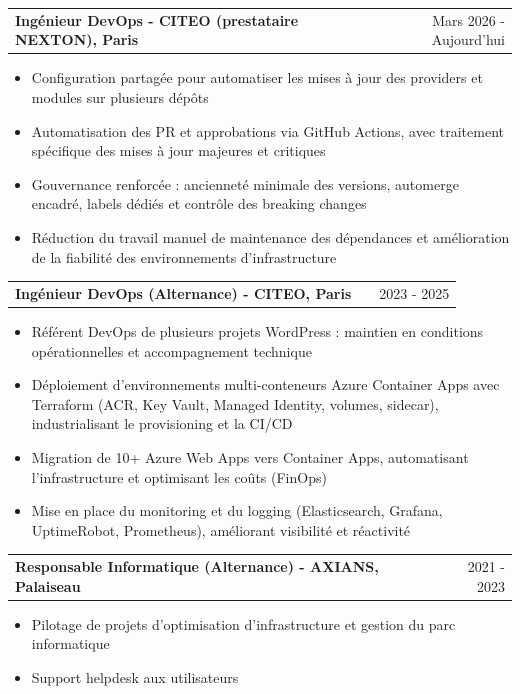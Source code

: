 \documentclass[a4paper,10pt]{article}
\makeatletter
\newenvironment{joblong}[2]
    {
    \begin{tabularx}{\linewidth}{@{}l X r@{}}
    \textbf{#1} & \hfill &  #2 \\[2pt]
    \end{tabularx}
    \begin{minipage}[t]{\linewidth}
    \begin{itemize}[after=\strut, leftmargin=1em, itemsep=3pt,label=--]
    }
    {
    \end{itemize}
    \end{minipage}    
    }
\makeatother
\begin{document}
\begin{joblong}{Ingénieur DevOps - CITEO (prestataire NEXTON), Paris}{Mars 2026 - Aujourd'hui}
\begin{itemize}[nosep, leftmargin=1em, itemsep=0pt, label=\textbullet]
\item Configuration partagée pour automatiser les mises à jour des providers et modules sur plusieurs dépôts
\item Automatisation des PR et approbations via GitHub Actions, avec traitement spécifique des mises à jour majeures et critiques
\item Gouvernance renforcée : ancienneté minimale des versions, automerge encadré, labels dédiés et contrôle des breaking changes
\item Réduction du travail manuel de maintenance des dépendances et amélioration de la fiabilité des environnements d’infrastructure
\end{itemize}
\end{joblong}


\vspace{2pt}

\begin{joblong}{Ingénieur DevOps (Alternance) - CITEO, Paris}{2023 - 2025}
\item Référent DevOps de plusieurs projets WordPress : maintien en conditions opérationnelles et accompagnement technique
\item Déploiement d'environnements multi-conteneurs Azure Container Apps avec Terraform (ACR, Key Vault, Managed Identity, volumes, sidecar), industrialisant le provisioning et la CI/CD
\item Migration de 10+ Azure Web Apps vers Container Apps, automatisant l'infrastructure et optimisant les coûts (FinOps)
\item Mise en place du monitoring et du logging (Elasticsearch, Grafana, UptimeRobot, Prometheus), améliorant visibilité et réactivité
\end{joblong}

\vspace{2pt}

\begin{joblong}{Responsable Informatique (Alternance) - AXIANS, Palaiseau}{2021 - 2023}
\item Pilotage de projets d'optimisation d'infrastructure et gestion du parc informatique
\item Support helpdesk aux utilisateurs
\end{joblong}

\vspace{3pt}

\end{document}

